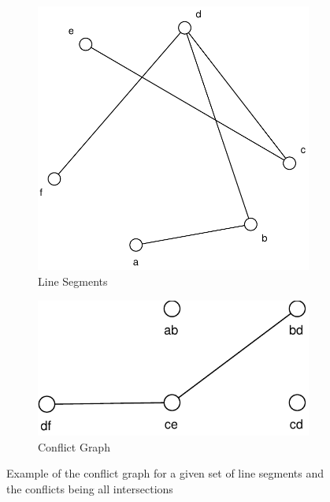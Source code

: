 \begin{figure}[ht]
  \centering
  \begin{subfigure}{0.4\textwidth}
          \centering
          \includegraphics[width=\textwidth]{img/example_conflict_graph_segments.pdf}
          \caption{Line Segments}
  \end{subfigure}
  \hspace{2em}
  \VRule
  \hspace{2em}
  \begin{subfigure}{0.4\textwidth}
          \centering
          \includegraphics[width=\textwidth]{img/example_conflict_graph.pdf}
          \caption{Conflict Graph}
  \end{subfigure}  
  \caption{\label{fig:example_conflict_graph}Example of the conflict %
    graph for a given set of line segments %
    and the conflicts being all intersections}
\end{figure}

